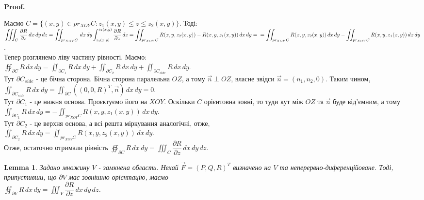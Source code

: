 \documentclass[a4paper, 10pt]{article}
\makeatletter
\def\departial#1#2{\dfrac{\partial {#1}}{\partial {#2}}}
\def\qed{$\blacksquare$}
\theoremstyle{theoremdd}
\theoremstyle{theoremdd}
\theoremstyle{theoremdd}
\theoremstyle{theoremdd}
\theoremstyle{theoremdd}
\theoremstyle{theoremdd}
\theoremstyle{theoremdd}
\newtheorem{lemma}[theorem]{Lemma}
\theoremstyle{theoremdd}
\renewenvironment{proof}[1][Proof.\\]{\par
\pushQED{\hfill \qed}%
\normalfont \topsep6\p@\@plus6\p@\relax
\trivlist
\item\relax
{\bfseries
#1\@addpunct{.}}\hspace\labelsep\ignorespaces
}{%
\popQED\endtrivlist\@endpefalse
}
\makeatother
\begin{document}
\begin{proof}
Маємо $C = \{ (x,y) \in pr_{XOY}C: z_1(x,y) \leq z \leq z_2(x,y) \}$. Тоді:\\
$\displaystyle\iiint_C \departial{R}{z}\,dx\,dy\,dz = \iint_{pr_{XOY} C}\,dx\,dy \int_{z_1(x,y)}^{z_2(x,y)} \departial{R}{z}\,dz = \iint_{pr_{XOY} C} R(x,y,z_2(x,y)) - R(x,y,z_1(x,y))\,dx\,dy = \\
= \iint_{pr_{XOY} C} R(x,y,z_2(x,y))\,dx\,dy - \iint_{pr_{XOY} C} R(x,y,z_1(x,y))\,dx\,dy$.\\
Тепер розглянемо ліву частину рівності. Маємо:\\
$\displaystyle\oiint_{\partial C} R\,dx\,dy = \iint_{\partial C_1} R\,dx\,dy + \iint_{\partial C_2} R\,dx\,dy + \iint_{\partial C_{side}} R\,dx\,dy$.\\
Тут $\partial C_{side}$ - це бічна сторона. Бічна сторона паралельна $OZ$, а тому $\vec{n} \perp OZ$, власне звідси $\vec{n} = (n_1,n_2,0)$. Таким чином,\\
$\displaystyle\iint_{\partial C_{side}} R\,dx\,dy = \iint_{\partial C} ((0,0,R)^T, \vec{n})\,dx\,dy = 0$.\\
Тут $\partial C_1$ - це нижня основа. Проєктуємо його на $XOY$. Оскільки $C$ орієнтовна зовні, то туди кут між $OZ$ та $\vec{n}$ буде від'ємним, а тому \\
$\displaystyle\iint_{\partial C_1} R\,dx\,dy = -\iint_{pr_{XOY} C} R(x,y,z_1(x,y))\,dx\,dy$.\\
Тут $\partial C_2$ - це верхня основа, а всі решта міркування аналогічні, отже,\\
$\displaystyle\iint_{\partial C_2} R\,dx\,dy = \iint_{pr_{XOY} C} R(x,y,z_2(x,y))\,dx\,dy$.\\
Отже, остаточно отримали рівність $\displaystyle\oiint_{\partial C} R\,dx\,dy = \iiint_C \departial{R}{z}\,dx\,dy\,dz$.
\end{proof}

\begin{lemma}
Задано множину $V$ - замкнена область. Нехай $\vec{F} = (P,Q,R)^T$ визначено на $V$ та неперервно-диференційоване. Тоді, припустивши, що $\partial V$ має зовнішню орієнтацію, маємо\\
$\displaystyle\oiint_{\partial V} R\,dx\,dy = \iiint_V \departial{R}{z}\,dx\,dy\,dz$.
\end{lemma}
\end{document}
